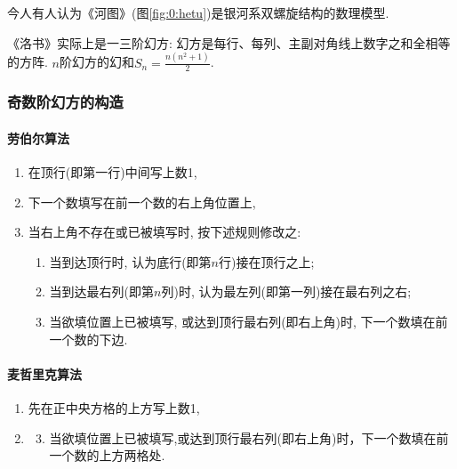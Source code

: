         今人有人认为《河图》(图\ref{fig:0:hetu})是银河系双螺旋结构的数理模型.

        《洛书》实际上是一三阶幻方: \textsf{幻方}是每行、每列、主副对角线上数字之和全相等的方阵. $n$阶幻方的\textsf{幻和}$S_n=\frac{n(n^2+1)}{2}$.

        \subsubsection{奇数阶幻方的构造}

            \paragraph{劳伯尔算法}

                \begin{enumerate}
                    \item 在顶行(即第一行)中间写上数1,
                    \item 下一个数填写在前一个数的右上角位置上,
                    \item 当右上角不存在或已被填写时, 按下述规则修改之:
                        \begin{enumerate}
                            \item 当到达顶行时, 认为底行(即第$n$行)接在顶行之上;
                            \item 当到达最右列(即第$n$列)时, 认为最左列(即第一列)接在最右列之右;
                            \item 当欲填位置上已被填写, 或达到顶行最右列(即右上角)时, 下一个数填在前一个数的下边.
                        \end{enumerate}
                \end{enumerate}

            \paragraph{麦哲里克算法}

                \begin{enumerate}
                    \item 先在正中央方格的上方写上数1,
                    \setcounter{enumi}{2}
                    \item 
                        \begin{enumerate}
                            \setcounter{enumii}{2}
                            \item 当欲填位置上已被填写,或达到顶行最右列(即右上角)时，下一个数填在前一个数的上方两格处.
                        \end{enumerate}
                \end{enumerate}


